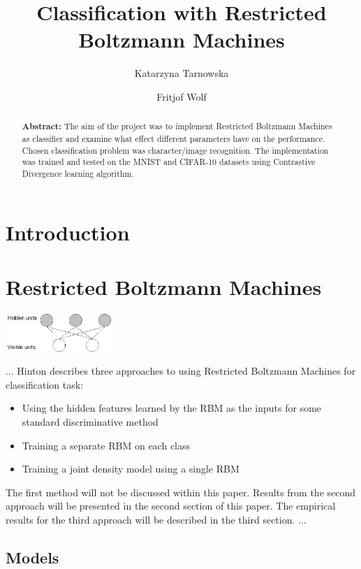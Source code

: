 \documentclass[a4paper]{scrartcl}
\begin{document}
\title{Classification with Restricted Boltzmann Machines}
\author{Katarzyna Tarnowska \and Fritjof Wolf}
\maketitle

\begin{abstract}
\textbf{Abstract:}
The aim of the project was to implement Restricted Boltzmann Machines as classifier and examine what effect different parameters have on the performance. Chosen classification problem was character/image recognition. The implementation was trained and tested on the MNIST and CIFAR-10 datasets using Contrastive Divergence learning algorithm. 
\end{abstract}

\section{Introduction}



\section{Restricted Boltzmann Machines}
\begin{center}
\includegraphics[width=4cm]{images/rbm.png}
\end{center} 
...
Hinton \cite{Hinton} describes three approaches to using Restricted Boltzmann Machines for classification task:
\begin{itemize}
    \item Using the hidden features learned by the RBM as the inputs for some standard discriminative method
    \item Training a separate RBM on each class
	\item Training a joint density model using a single RBM
\end{itemize}
The first method will not be discussed within this paper. Results from the second approach will be presented in the second section of this paper. The empirical results for the third approach will be described in the third section.
...
\subsection{Models}
\end{document}
